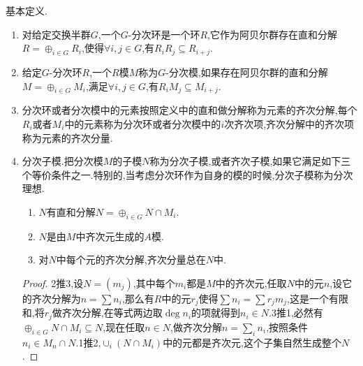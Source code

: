 基本定义.
\begin{enumerate}
	\item 对给定交换半群$G$,一个$G$-分次环是一个环$R$,它作为阿贝尔群存在直和分解$R=\oplus_{i\in G}R_i$,使得$\forall i,j\in G$,有$R_iR_j\subseteq R_{i+j}$.
	\item 给定$G$-分次环$R$,一个$R$模$M$称为$G$-分次模,如果存在阿贝尔群的直和分解$M=\oplus_{i\in G}M_i$,满足$\forall i,j\in G$,有$R_iM_j\subseteq M_{i+j}$.
	\item 分次环或者分次模中的元素按照定义中的直和做分解称为元素的齐次分解,每个$R_i$或者$M_i$中的元素称为分次环或者分次模中的$i$次齐次项,齐次分解中的齐次项称为元素的齐次分量.
	\item 分次子模.把分次模$M$的子模$N$称为分次子模,或者齐次子模,如果它满足如下三个等价条件之一.特别的,当考虑分次环作为自身的模的时候,分次子模称为分次理想.
	\begin{enumerate}
		\item $N$有直和分解$N=\oplus_{i\in G}N\cap M_i$.
		\item $N$是由$M$中齐次元生成的$A$模.
		\item 对$N$中每个元的齐次分解,齐次分量总在$N$中.
	\end{enumerate}
	\begin{proof}
		
		2推3,设$N=(m_j)$,其中每个$m_i$都是$M$中的齐次元,任取$N$中的元$n$,设它的齐次分解为$n=\sum n_i$,那么有$R$中的元$r_j$使得$\sum n_i=\sum r_jm_j$,这是一个有限和,将$r_j$做齐次分解,在等式两边取$\deg n_i$的项就得到$n_i\in N$.3推1,必然有$\oplus_{i\in G}N\cap M_i\subseteq N$,现在任取$n\in N$,做齐次分解$n=\sum_i n_i$,按照条件$n_i\in M_n\cap N$.1推2,$\cup_i(N\cap M_i)$中的元都是齐次元,这个子集自然生成整个$N$.
	\end{proof}
\end{enumerate}

